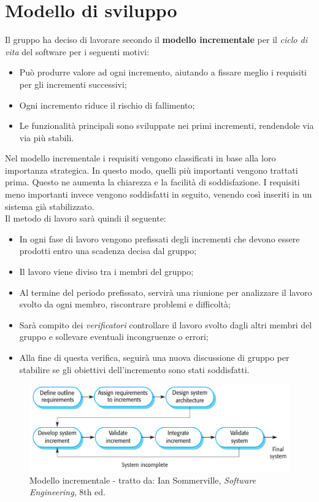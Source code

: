 \section{Modello di sviluppo} \label{section:modello_di_sviluppo}
Il gruppo ha deciso di lavorare secondo il \textbf{modello incrementale} per il \textit{ciclo di vita}\glo{} del software per i seguenti motivi:
\begin{itemize}
  \item Può produrre valore ad ogni incremento, aiutando a fissare meglio i requisiti per gli incrementi successivi;
  \item Ogni incremento riduce il rischio di fallimento;
  \item Le funzionalità principali sono sviluppate nei primi incrementi, rendendole via via più stabili.
\end{itemize}
Nel modello incrementale i requisiti vengono classificati in base alla loro importanza strategica. In questo modo, quelli più importanti vengono 
trattati prima. Questo ne aumenta la chiarezza e la facilità di soddisfazione. I requisiti meno importanti invece vengono soddisfatti in seguito, 
venendo così inseriti in un sistema già stabilizzato.\\
Il metodo di lavoro sarà quindi il seguente:
\begin{itemize}
  \item In ogni fase di lavoro vengono prefissati degli incrementi che devono essere prodotti entro una scadenza decisa dal gruppo;
  \item Il lavoro viene diviso tra i membri del gruppo;
  \item Al termine del periodo prefissato, servirà una riunione per analizzare il lavoro svolto da ogni membro, riscontrare problemi e difficoltà;
  \item Sarà compito dei \textit{verificatori} controllare il lavoro svolto dagli altri membri del gruppo e sollevare eventuali incongruenze o errori;
  \item Alla fine di questa verifica, seguirà una nuova discussione di gruppo per stabilire se gli obiettivi dell'incremento sono stati soddisfatti.
\end{itemize}

\begin{figure}[H]
	\centering
  \includegraphics[scale=0.6]{immagini/modello_incrementale.png}
  \caption{Modello incrementale - tratto da: Ian Sommerville, \textit{Software Engineering}, 8th ed.}
\end{figure}
\pagebreak

